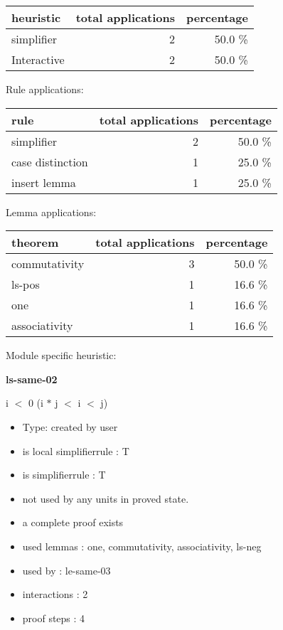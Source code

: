 \documentclass[a4paper]{article}
\begin{document}
\begin{supertabular}{l|r|r}
heuristic	& total applications & percentage \\ \hline
simplifier & 2 & 50.0 \% \\
Interactive & 2 & 50.0 \% \\

\end{supertabular}

Rule applications:

\begin{supertabular}{l|r|r}
rule	        & total applications & percentage \\ \hline
simplifier & 2 & 50.0 \% \\
case distinction & 1 & 25.0 \% \\
insert lemma & 1 & 25.0 \% \\

\end{supertabular}

Lemma applications:

\begin{supertabular}{l|r|r}
theorem	        & total applications & percentage \\ \hline
commutativity & 3 & 50.0 \% \\
ls-pos & 1 & 16.6 \% \\
one & 1 & 16.6 \% \\
associativity & 1 & 16.6 \% \\

\end{supertabular}

Module specific heuristic:

\pagebreak

{\LARGE\bf ls-same-02}\label{lemma-ls-same-02}

\medskip

 \Fol i $<$ 0 \Imp (i $*$ j $<$ i  $<$ j)

\begin{itemize}

\item Type: created by user

\item is local simplifierrule : T
\item is simplifierrule : T
\item not used by any units in proved state.
\item       a complete proof exists
\item       used lemmas  : one, commutativity, associativity, ls-neg
\item       used by      : le-same-03
\item       interactions : 2
\item       proof steps  : 4
\end{itemize}
\end{document}
